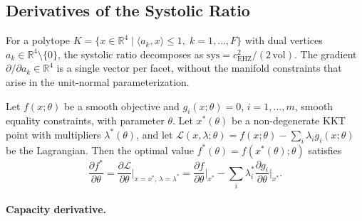 
\subsection{Derivatives of the Systolic Ratio}
\label{sec:sys-optimization}


For a polytope $K = \{x \in \mathbb{R}^4 \mid \langle a_k, x \rangle \le 1,\; k=1,\dots,F\}$
with dual vertices $a_k \in \mathbb{R}^4 \setminus \{0\}$,
the systolic ratio decomposes as
$\mathrm{sys} = c_{\mathrm{EHZ}}^2 / (2\,\mathrm{vol})$.
The gradient $\partial/\partial a_k \in \mathbb{R}^4$ is a single vector
per facet, without the manifold constraints that arise in the unit-normal
parameterization.

\begin{theorem*}
Let $f(x;\theta)$ be a smooth objective and $g_i(x;\theta) = 0$,
$i = 1,\dots,m$, smooth equality constraints, with parameter $\theta$.
Let $x^*(\theta)$ be a non-degenerate KKT point with multipliers
$\lambda^*(\theta)$, and let
$\mathcal{L}(x,\lambda;\theta) = f(x;\theta) - \sum_i \lambda_i g_i(x;\theta)$
be the Lagrangian.
Then the optimal value $f^*(\theta) = f(x^*(\theta);\theta)$ satisfies
\[
  \frac{\partial f^*}{\partial \theta}
  = \frac{\partial \mathcal{L}}{\partial \theta}\bigg|_{x=x^*,\,\lambda=\lambda^*}
  = \frac{\partial f}{\partial \theta}\bigg|_{x^*}
    - \sum_i \lambda_i^* \frac{\partial g_i}{\partial \theta}\bigg|_{x^*}.
\]
\end{theorem*}

\paragraph{Capacity derivative.}

